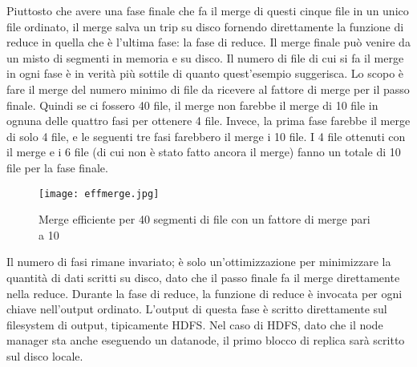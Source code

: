 Piuttosto che avere una fase finale che fa il merge di questi cinque file in un unico file ordinato, il merge salva un trip su disco fornendo direttamente la funzione di reduce in quella che è l'ultima fase: la fase di reduce. Il merge finale può venire da un misto di segmenti in memoria e su disco. Il numero di file di cui si fa il merge in ogni fase è in verità più sottile di quanto quest'esempio suggerisca. Lo scopo è fare il merge del numero minimo di file da ricevere al fattore di merge per il passo finale. Quindi se ci fossero 40 file, il merge non farebbe il merge di 10 file in ognuna delle quattro fasi per ottenere 4 file. Invece, la prima fase farebbe il merge di solo 4 file, e le seguenti tre fasi farebbero il merge i 10 file. I 4 file ottenuti con il merge e i 6 file (di cui non è stato fatto ancora il merge) fanno un totale di 10 file per la fase finale.
\begin{figure}
  \begin{center}
    \texttt{[image: effmerge.jpg]}
    \caption{Merge efficiente per 40 segmenti di file con un fattore di merge pari a 10}
    \label{fig:merge}
  \end{center}
\end{figure}
Il numero di fasi rimane invariato; è solo un'ottimizzazione per minimizzare la quantità di dati scritti su disco, dato che il passo finale fa il merge direttamente nella reduce.
Durante la fase di reduce, la funzione di reduce è invocata per ogni chiave nell'output ordinato. L'output di questa fase è scritto direttamente sul filesystem di output, tipicamente HDFS. Nel caso di HDFS, dato che il node manager sta anche eseguendo un datanode, il primo blocco di replica sarà scritto sul disco locale.
